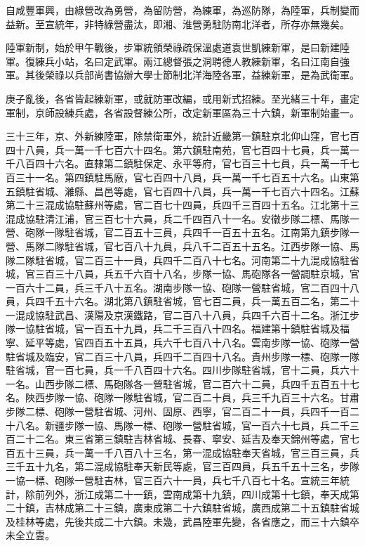 \begin{pinyinscope}
自咸豐軍興，由綠營改為勇營，為留防營，為練軍，為巡防隊，為陸軍，兵制變而益新。至宣統年，非特綠營盡汰，即湘、淮營勇駐防南北洋者，所存亦無幾矣。

陸軍新制，始於甲午戰後，步軍統領榮祿疏保溫處道袁世凱練新軍，是曰新建陸軍。復練兵小站，名曰定武軍。兩江總督張之洞聘德人教練新軍，名曰江南自強軍。其後榮祿以兵部尚書協辦大學士節制北洋海陸各軍，益練新軍，是為武衛軍。

庚子亂後，各省皆起練新軍，或就防軍改編，或用新式招練。至光緒三十年，畫定軍制，京師設練兵處，各省設督練公所，改定新軍區為三十六鎮，新軍制始畫一。

三十三年，京、外新練陸軍，除禁衛軍外，統計近畿第一鎮駐京北仰山窪，官七百四十八員，兵一萬一千七百六十四名。第六鎮駐南苑，官七百四十七員，兵一萬一千八百四十六名。直隸第二鎮駐保定、永平等府，官七百三十七員，兵一萬一千七百三十一名。第四鎮駐馬廠，官七百四十八員，兵一萬一千七百五十六名。山東第五鎮駐省城、濰縣、昌邑等處，官七百四十八員，兵一萬一千七百六十四名。江蘇第二十三混成協駐蘇州等處，官二百七十四員，兵四千三百四十五名。江北第十三混成協駐清江浦，官三百七十六員，兵二千四百八十一名。安徽步隊二標、馬隊一營、砲隊一隊駐省城，官二百五十三員，兵四千一百五十五名。江南第九鎮步隊一營、馬隊二隊駐省城，官七百八十九員，兵八千二百五十五名。江西步隊一協、馬隊二隊駐省城，官二百三十一員，兵四千二百八十七名。河南第二十九混成協駐省城，官三百三十八員，兵五千六百十八名，步隊一協、馬砲隊各一營調駐京城，官一百六十二員，兵三千八十五名。湖南步隊一協、砲隊一營駐省城，官二百四十八員，兵四千五十六名。湖北第八鎮駐省城，官七百二員，兵一萬五百二名，第二十一混成協駐武昌、漢陽及京漢鐵路，官二百八十八員，兵四千六百十二名。浙江步隊一協駐省城，官一百五十九員，兵二千三百八十四名。福建第十鎮駐省城及福寧、延平等處，官四百五十五員，兵六千七百八十八名。雲南步隊一協、砲隊一營駐省城及臨安，官二百三十八員，兵四千二百四十八名。貴州步隊一標、砲隊一隊駐省城，官一百七員，兵一千八百四十六名。四川步隊駐省城，官十二員，兵六十一名。山西步隊二標、馬砲隊各一營駐省城，官二百六十二員，兵四千五百五十七名。陜西步隊一協、砲隊一隊駐省城，官二百二十員，兵三千九百三十六名。甘肅步隊二標、砲隊一營駐省城、河州、固原、西寧，官二百二十一員，兵四千一百二十八名。新疆步隊一協、馬隊一標、砲隊一營駐省城，官一百六十七員，兵二千三百二十二名。東三省第三鎮駐吉林省城、長春、寧安、延吉及奉天錦州等處，官七百五十三員，兵一萬一千八百八十三名，第一混成協駐奉天省城，官三百三員，兵三千五十九名，第二混成協駐奉天新民等處，官三百四員，兵五千五十三名，步隊一協一標、砲隊一營駐吉林，官三百六十一員，兵七千八百七十名。宣統三年統計，除前列外，浙江成第二十一鎮，雲南成第十九鎮，四川成第十七鎮，奉天成第二十鎮，吉林成第二十三鎮，廣東成第二十六鎮駐省城，廣西成第二十五鎮駐省城及桂林等處，先後共成二十六鎮。未幾，武昌陸軍先變，各省應之，而三十六鎮卒未全立雲。


\end{pinyinscope}